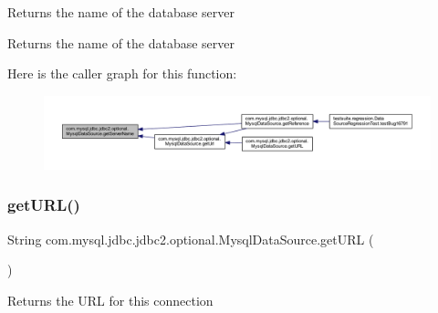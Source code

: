 Returns the name of the database server

\begin{DoxyReturn}{Returns}
the name of the database server 
\end{DoxyReturn}
Here is the caller graph for this function\+:
\nopagebreak
\begin{figure}[H]
\begin{center}
\leavevmode
\includegraphics[width=350pt]{classcom_1_1mysql_1_1jdbc_1_1jdbc2_1_1optional_1_1_mysql_data_source_a91c1773084dd32d26ff498f5efac43ef_icgraph}
\end{center}
\end{figure}
\mbox{\label{classcom_1_1mysql_1_1jdbc_1_1jdbc2_1_1optional_1_1_mysql_data_source_a53c7e30b2c6b71edcd194fd8ecd5ebba}} 
\subsubsection{\texorpdfstring{get\+U\+R\+L()}{getURL()}}
{\footnotesize\ttfamily String com.\+mysql.\+jdbc.\+jdbc2.\+optional.\+Mysql\+Data\+Source.\+get\+U\+RL (\begin{DoxyParamCaption}{ }\end{DoxyParamCaption})}

Returns the U\+RL for this connection

